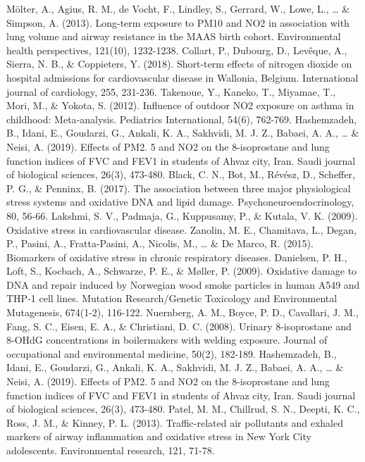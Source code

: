 \documentclass[12pt,]{article}
\begin{document}
Mölter, A., Agius, R. M., de Vocht, F., Lindley, S., Gerrard, W., Lowe,
L., \ldots{} \& Simpson, A. (2013). Long-term exposure to PM10 and NO2
in association with lung volume and airway resistance in the MAAS birth
cohort. Environmental health perspectives, 121(10), 1232-1238. Collart,
P., Dubourg, D., Levêque, A., Sierra, N. B., \& Coppieters, Y. (2018).
Short-term effects of nitrogen dioxide on hospital admissions for
cardiovascular disease in Wallonia, Belgium. International journal of
cardiology, 255, 231-236. Takenoue, Y., Kaneko, T., Miyamae, T., Mori,
M., \& Yokota, S. (2012). Influence of outdoor NO2 exposure on asthma in
childhood: Meta‐analysis. Pediatrics International, 54(6), 762-769.
Hashemzadeh, B., Idani, E., Goudarzi, G., Ankali, K. A., Sakhvidi, M. J.
Z., Babaei, A. A., \ldots{} \& Neisi, A. (2019). Effects of PM2. 5 and
NO2 on the 8-isoprostane and lung function indices of FVC and FEV1 in
students of Ahvaz city, Iran. Saudi journal of biological sciences,
26(3), 473-480. Black, C. N., Bot, M., Révész, D., Scheffer, P. G., \&
Penninx, B. (2017). The association between three major physiological
stress systems and oxidative DNA and lipid damage.
Psychoneuroendocrinology, 80, 56-66. Lakshmi, S. V., Padmaja, G.,
Kuppusamy, P., \& Kutala, V. K. (2009). Oxidative stress in
cardiovascular disease. Zanolin, M. E., Chamitava, L., Degan, P.,
Pasini, A., Fratta-Pasini, A., Nicolis, M., \ldots{} \& De Marco, R.
(2015). Biomarkers of oxidative stress in chronic respiratory diseases.
Danielsen, P. H., Loft, S., Kocbach, A., Schwarze, P. E., \& Møller, P.
(2009). Oxidative damage to DNA and repair induced by Norwegian wood
smoke particles in human A549 and THP-1 cell lines. Mutation
Research/Genetic Toxicology and Environmental Mutagenesis, 674(1-2),
116-122. Nuernberg, A. M., Boyce, P. D., Cavallari, J. M., Fang, S. C.,
Eisen, E. A., \& Christiani, D. C. (2008). Urinary 8-isoprostane and
8-OHdG concentrations in boilermakers with welding exposure. Journal of
occupational and environmental medicine, 50(2), 182-189. Hashemzadeh,
B., Idani, E., Goudarzi, G., Ankali, K. A., Sakhvidi, M. J. Z., Babaei,
A. A., \ldots{} \& Neisi, A. (2019). Effects of PM2. 5 and NO2 on the
8-isoprostane and lung function indices of FVC and FEV1 in students of
Ahvaz city, Iran. Saudi journal of biological sciences, 26(3), 473-480.
Patel, M. M., Chillrud, S. N., Deepti, K. C., Ross, J. M., \& Kinney, P.
L. (2013). Traffic-related air pollutants and exhaled markers of airway
inflammation and oxidative stress in New York City adolescents.
Environmental research, 121, 71-78.
\end{document}
